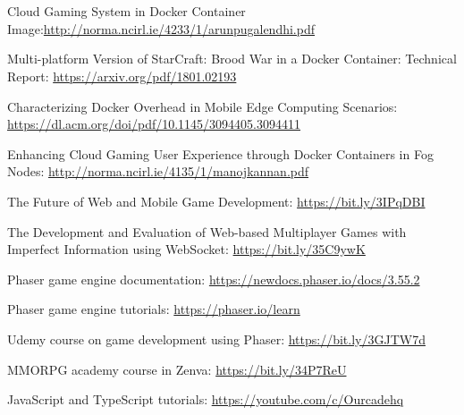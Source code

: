 \documentclass[oneside,12pt]{Classes/VTU}
\begin{document}
	\section*{}
	\pagebreak
	\begin{thebibliography}{99}
		\thispagestyle{fancy}
		 Cloud Gaming System in Docker Container Image:\newline \url{http://norma.ncirl.ie/4233/1/arunpugalendhi.pdf}
		
		 Multi-platform Version of StarCraft: Brood War in a Docker Container: Technical Report: \newline \url{https://arxiv.org/pdf/1801.02193}
		
		 Characterizing Docker Overhead in Mobile Edge Computing Scenarios: \newline \url{https://dl.acm.org/doi/pdf/10.1145/3094405.3094411}
		
		 Enhancing Cloud Gaming User Experience through Docker Containers in Fog Nodes: \newline \url{http://norma.ncirl.ie/4135/1/manojkannan.pdf}
		
		 The Future of Web and Mobile Game Development: \newline \url{https://bit.ly/3IPqDBI}
		
		 The Development and Evaluation of Web-based Multiplayer Games with Imperfect Information using WebSocket: \newline \url{https://bit.ly/35C9ywK}
		
		 Phaser game engine documentation: \newline \url{https://newdocs.phaser.io/docs/3.55.2}
		
		 Phaser game engine tutorials: \newline  \url{https://phaser.io/learn}
		
		 Udemy course on game development using Phaser: \newline \url{https://bit.ly/3GJTW7d}
		
		 MMORPG academy course in Zenva: \newline \url{https://bit.ly/34P7ReU}
		
		 JavaScript and TypeScript tutorials: \newline \url{https://youtube.com/c/Ourcadehq}
	\end{thebibliography}
\end{document}
